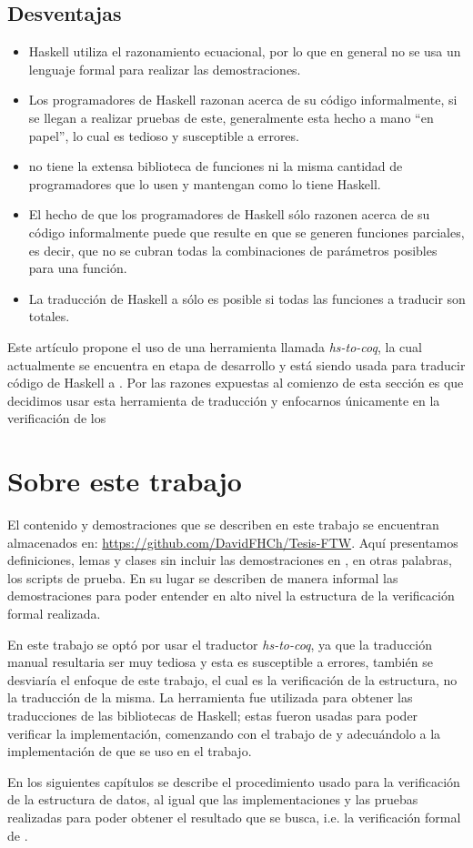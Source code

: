\subsection{Desventajas}
\begin{itemize}
    \item Haskell utiliza el razonamiento ecuacional, por lo que en general no se usa un lenguaje formal para realizar las demostraciones.
    \item Los programadores de Haskell razonan acerca de su código informalmente, si se llegan a
    realizar pruebas de este, generalmente esta hecho a mano ``en papel'', lo cual es tedioso y
    susceptible a errores.
    \item {\coq} no tiene la extensa biblioteca de funciones ni la misma cantidad de programadores
    que lo usen y mantengan como lo tiene Haskell.
    \item El hecho de que los programadores de Haskell s\'olo razonen acerca de su código
    informalmente puede que resulte en que se generen funciones parciales, es decir, que no se
    cubran todas la combinaciones de parámetros posibles para una funci\'on.
    \item La traducci\'on de Haskell a {\coq} s\'olo es posible si todas las funciones a traducir son
    totales.
\end{itemize}

Este art\'iculo propone el uso de una herramienta llamada \textit{hs-to-coq}, la cual actualmente se
encuentra en etapa de desarrollo y est\'a siendo usada para traducir código de Haskell a {\coq}. Por las razones expuestas al comienzo de esta secci\'on es que decidimos usar esta herramienta de traducci\'on y enfocarnos \'unicamente en la verificaci\'on de los \arns

\section{Sobre este trabajo}
El contenido y demostraciones que se describen en este trabajo se encuentran almacenados en:
\url{https://github.com/DavidFHCh/Tesis-FTW}. Aqu\'i presentamos definiciones, lemas y clases sin
incluir las demostraciones en {\coq}, en otras palabras, los scripts de prueba. En su lugar se describen de manera informal las demostraciones para poder entender en alto nivel la estructura de la verificaci\'on formal realizada.

En este trabajo se opt\'o por usar el traductor \textit{hs-to-coq}, ya que la traducci\'on manual
resultaria ser muy tediosa y esta es susceptible a errores, tambi\'en se desviaría el enfoque de
este trabajo, el cual es la verificaci\'on de la estructura, no la traducci\'on de la misma. La
herramienta fue utilizada para obtener las traducciones de las bibliotecas de Haskell; estas fueron
usadas para poder verificar la implementación, comenzando con el trabajo de \cite{tesisG} y adecuándolo a la implementaci\'on de 
\cite{MSetRBT} que se uso en el trabajo.

En los siguientes capítulos se describe el procedimiento usado para la verificaci\'on de la
estructura de datos, al igual que las implementaciones y las pruebas realizadas para poder obtener
el resultado que se busca, i.e. la verificación formal de {\arns}.
